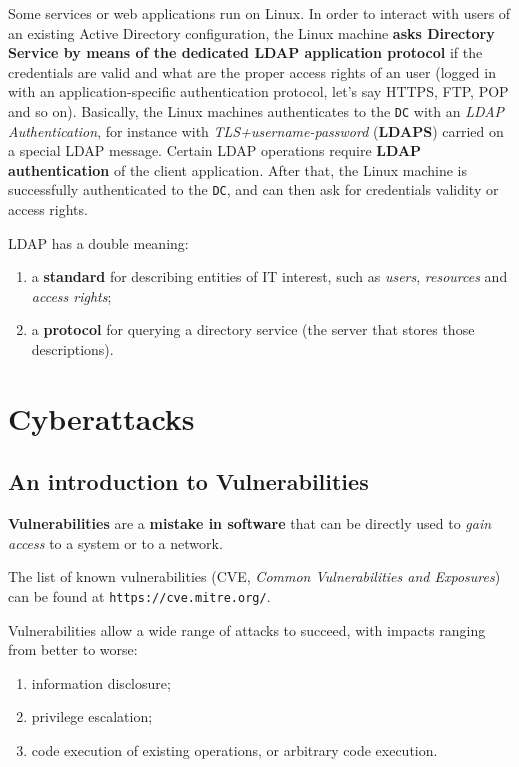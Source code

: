 \documentclass[10pt]{\classname}
\begin{document}
Some services or web applications run on Linux. In order to interact with users
of an existing Active Directory configuration, the Linux machine \textbf{asks
Directory Service by means of the dedicated LDAP application protocol} if the
credentials are valid and what are the proper access rights of an user (logged
in with an application\--specific authentication protocol, let's say HTTPS,
FTP, POP and so on). Basically, the Linux machines authenticates to the
\texttt{DC} with an \emph{LDAP Authentication}, for instance with
\emph{TLS+username\--password} (\textbf{LDAPS}) carried on a special LDAP
message. Certain LDAP operations require \textbf{LDAP authentication} of the
client application. After that, the Linux machine is successfully authenticated
to the \texttt{DC}, and can then ask for credentials validity or access rights.


LDAP has a double meaning:
\begin{enumerate}
    \item a \textbf{standard} for describing entities of IT interest, such as
        \emph{users}, \emph{resources} and \emph{access rights};
    \item a \textbf{protocol} for querying a directory service (the server that
        stores those descriptions).
\end{enumerate}





\part{Cyberattacks}

\chapter{An introduction to Vulnerabilities}

\textbf{Vulnerabilities} are a \textbf{mistake in software} that can be
directly used to \emph{gain access} to a system or to a network.

The list of known vulnerabilities (CVE, \emph{Common Vulnerabilities and
Exposures}) can be found at \texttt{https://cve.mitre.org/}.

Vulnerabilities allow a wide range of attacks to succeed, with impacts ranging
from better to worse:
\begin{enumerate}
    \item information disclosure;
    \item privilege escalation;
    \item code execution of existing operations, or arbitrary code execution.
\end{enumerate}
\end{document}
